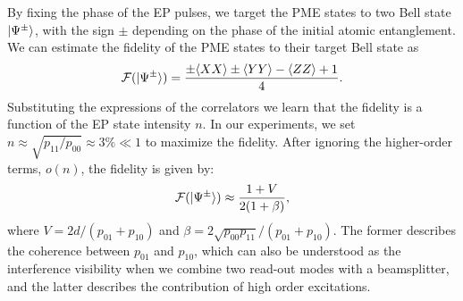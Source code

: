 \documentclass[aps,reprint,showpacs,superscriptaddress]{revtex4-2}
\begin{document}
By fixing the phase of the EP pulses, we target the PME states to two Bell state $\ket{\Psi^\pm}$, with the sign $\pm$ depending on the phase of the initial atomic entanglement. We can estimate the fidelity of the PME states to their target Bell state as
\begin{equation}
	\mathcal{F}(\ket{\Psi^\pm})=\frac{\pm\langle XX\rangle\pm\langle YY\rangle-\langle ZZ\rangle+1}{4}.
\end{equation}
Substituting the expressions of the correlators we learn that the fidelity is a function of the EP state intensity $n$. In our experiments, we set $n\approx \sqrt{p_{11}/p_{00}}\approx 3\%\ll 1$ to maximize the fidelity. After ignoring the higher-order terms, $o(n)$, the fidelity is given by:
\begin{equation}
	\mathcal{F}(\ket{\Psi^\pm})\approx\frac{1+V}{2(1+\beta)},
	\label{eq: fidelity}
\end{equation}
where $V=2d/(p_{01}+p_{10})$ and $\beta=2\sqrt{p_{00}p_{11}}/(p_{01}+p_{10})$. The former describes the coherence between $p_{01}$ and $p_{10}$, which can also be understood as the interference visibility when we combine two read-out modes with a beamsplitter, and the latter describes the contribution of high order excitations.
\end{document}
